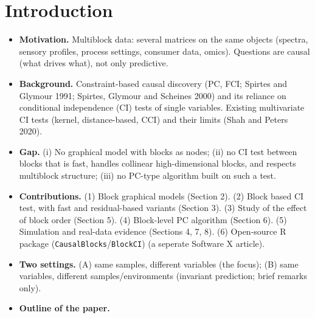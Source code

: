 \documentclass[10pt,leqno]{amsart}
\begin{document}
\section{Introduction}
\begin{itemize}
\item \textbf{Motivation.} Multiblock data: several matrices on the same objects
  (spectra, sensory profiles, process settings, consumer data, omics). Questions
  are causal (what drives what), not only predictive.
\item \textbf{Background.} Constraint-based causal discovery (PC, FCI; Spirtes and
  Glymour 1991; Spirtes, Glymour and Scheines 2000) and its reliance on
  conditional independence (CI) tests of single variables. Existing multivariate CI
  tests (kernel, distance-based, CCI) and their limits (Shah and Peters 2020).
\item \textbf{Gap.} (i) No graphical model with blocks as nodes; (ii) no CI test
  between blocks that is fast, handles collinear high-dimensional blocks, and
  respects multiblock structure; (iii) no PC-type algorithm built on such a test.
\item \textbf{Contributions.} (1) Block graphical models (Section 2).
  (2) Block based CI test, with fast and residual-based variants (Section 3).
  (3) Study of the effect of block order (Section 5).
  (4) Block-level PC algorithm (Section 6).
  (5) Simulation and real-data evidence (Sections 4, 7, 8).
  (6) Open-source R package (\texttt{CausalBlocks}/\texttt{BlockCI}) (a seperate Software X article).
\item \textbf{Two settings.} (A) same samples, different variables (the focus);
  (B) same variables, different samples/environments (invariant prediction;
  brief remarks only).
\item \textbf{Outline of the paper.}
\end{itemize}

\end{document}
